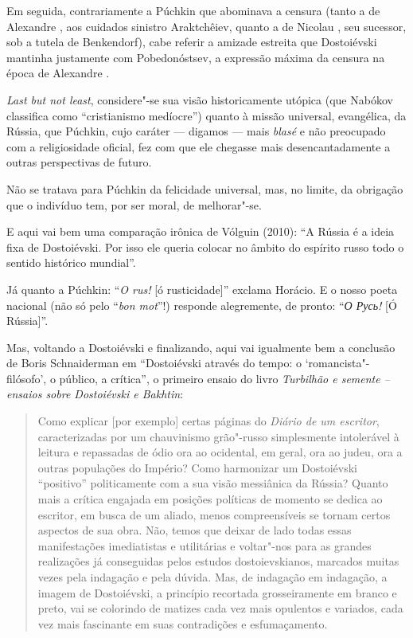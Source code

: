 Em seguida, contrariamente a Púchkin que abominava a censura (tanto a
de Alexandre , aos cuidados sinistro Araktchêiev, quanto a de Nicolau 
, seu sucessor, sob a tutela de Benkendorf), cabe referir a amizade
estreita que Dostoiévski mantinha justamente com Pobedonóstsev, a
expressão máxima da censura na época de Alexandre .

\emph{Last but not least}, considere"-se sua visão historicamente utópica
(que Nabókov classifica como ``cristianismo medíocre'') quanto à
missão universal, evangélica, da Rússia, que Púchkin, cujo caráter --- digamos --- mais \emph{blasé} e não preocupado com a religiosidade
oficial, fez com que ele chegasse mais desencantadamente a outras
perspectivas de futuro.

Não se tratava para Púchkin da felicidade universal, mas, no limite, da
obrigação que o indivíduo tem, por ser moral, de melhorar"-se.

E aqui vai bem uma comparação irônica de Vólguin (2010): ``A
Rússia é a ideia fixa de Dostoiévski. Por isso ele queria colocar no
âmbito do espírito russo todo o sentido histórico mundial''.

Já quanto a Púchkin: ``\emph{O rus!} [ó rusticidade]'' exclama Horácio. E o nosso poeta
nacional (não só pelo ``\emph{bon mot}''!) responde alegremente, de pronto: ``\emph{О
Русь!} [Ó Rússia]''.

Mas, voltando a Dostoiévski e finalizando, aqui vai igualmente bem a
conclusão de Boris Schnaiderman em ``Dostoiévski através do tempo:
o `romancista"-filósofo', o público, a crítica'', o primeiro ensaio
do livro \emph{Turbilhão e semente -- ensaios sobre Dostoiévski e
Bakhtin}:

\begin{quote}
Como explicar [por exemplo] certas páginas do
\emph{Diário de um escritor}, caracterizadas por um chauvinismo
grão"-russo simplesmente intolerável à leitura e repassadas de ódio ora
ao ocidental, em geral, ora ao judeu, ora a outras populações do
Império? Como harmonizar um Dostoiévski ``positivo'' politicamente com a
sua visão messiânica da Rússia? Quanto mais a crítica engajada em
posições políticas de momento se dedica ao escritor, em busca de um
aliado, menos compreensíveis se tornam certos aspectos de sua obra. Não,
temos que deixar de lado todas essas manifestações imediatistas e
utilitárias e voltar"-nos para as grandes realizações já conseguidas
pelos estudos dostoievskianos, marcados muitas vezes pela indagação e
pela dúvida. Mas, de indagação em indagação, a imagem de Dostoiévski, a
princípio recortada grosseiramente em branco e preto, vai se colorindo
de matizes cada vez mais opulentos e variados, cada vez mais fascinante
em suas contradições e esfumaçamento.
\end{quote}



